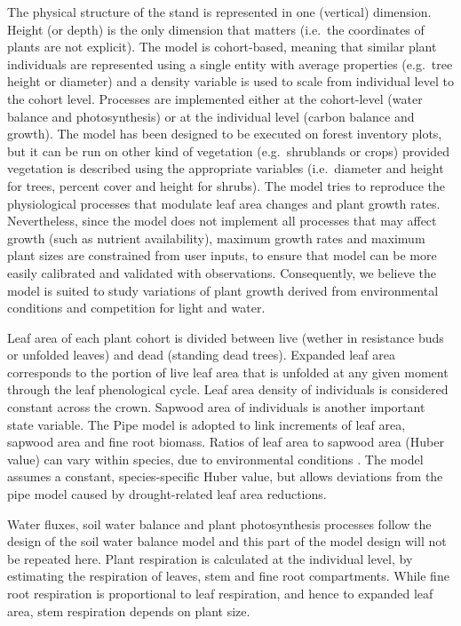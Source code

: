 \documentclass[]{book}
\begin{document}
The physical structure of the stand is represented in one (vertical)
dimension. Height (or depth) is the only dimension that matters
(i.e.~the coordinates of plants are not explicit). The model is
cohort-based, meaning that similar plant individuals are represented
using a single entity with average properties (e.g.~tree height or
diameter) and a density variable is used to scale from individual level
to the cohort level. Processes are implemented either at the
cohort-level (water balance and photosynthesis) or at the individual
level (carbon balance and growth). The model has been designed to be
executed on forest inventory plots, but it can be run on other kind of
vegetation (e.g.~shrublands or crops) provided vegetation is described
using the appropriate variables (i.e.~diameter and height for trees,
percent cover and height for shrubs). The model tries to reproduce the
physiological processes that modulate leaf area changes and plant growth
rates. Nevertheless, since the model does not implement all processes
that may affect growth (such as nutrient availability), maximum growth
rates and maximum plant sizes are constrained from user inputs, to
ensure that model can be more easily calibrated and validated with
observations. Consequently, we believe the model is suited to study
variations of plant growth derived from environmental conditions and
competition for light and water.

Leaf area of each plant cohort is divided between live (wether in
resistance buds or unfolded leaves) and dead (standing dead trees).
Expanded leaf area corresponds to the portion of live leaf area that is
unfolded at any given moment through the leaf phenological cycle. Leaf
area density of individuals is considered constant across the crown.
Sapwood area of individuals is another important state variable. The
Pipe model \citep{Shinozaki1964} is adopted to link increments of leaf
area, sapwood area and fine root biomass. Ratios of leaf area to sapwood
area (Huber value) can vary within species, due to environmental
conditions \citep{Mencuccini1995}. The model assumes a constant,
species-specific Huber value, but allows deviations from the pipe model
caused by drought-related leaf area reductions.

Water fluxes, soil water balance and plant photosynthesis processes
follow the design of the soil water balance model and this part of the
model design will not be repeated here. Plant respiration is calculated
at the individual level, by estimating the respiration of leaves, stem
and fine root compartments. While fine root respiration is proportional
to leaf respiration, and hence to expanded leaf area, stem respiration
depends on plant size.
\end{document}
